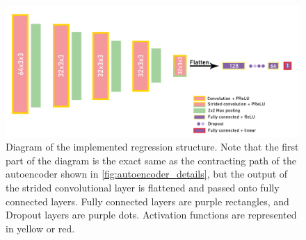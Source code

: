 \begin{figure}[!ht]
    \centering
    \includegraphics[width=.85\textwidth]{dissertation/figures/regression_final_structure.png}
    \caption{Diagram of the implemented regression structure. Note that the first part of the diagram is the exact same as the contracting path of the autoencoder shown in \ref{fig:autoencoder_details}, but the output of the strided convolutional layer is flattened and passed onto fully connected layers. Fully connected layers are purple rectangles, and Dropout layers are purple dots. Activation functions are represented in yellow or red.}
    \label{fig:regression_details}
\end{figure}
